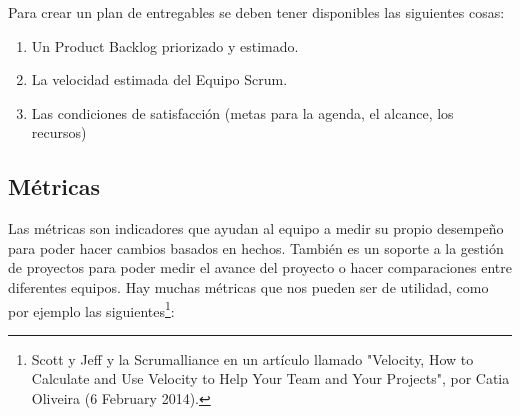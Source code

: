 Para crear un plan de entregables se deben tener disponibles las siguientes cosas:

\begin{enumerate}
\item Un Product Backlog priorizado y estimado.
\item La velocidad estimada del Equipo Scrum.
\item Las condiciones de satisfacción (metas para la agenda, el alcance, los recursos)
\end{enumerate}

\subsection{Métricas}
Las métricas son indicadores que ayudan al equipo a medir su propio desempeño para poder hacer cambios basados en hechos. También es un soporte a la gestión de proyectos para poder medir el avance del proyecto o hacer comparaciones entre diferentes equipos. Hay muchas métricas que nos pueden ser de utilidad, como por ejemplo las siguientes\footnote{Scott y Jeff \cite{Scott-Jeff-2013} y la  Scrumalliance en un artículo llamado "Velocity, How to Calculate and Use Velocity to Help Your Team and Your Projects", por Catia Oliveira (6 February 2014).}:

